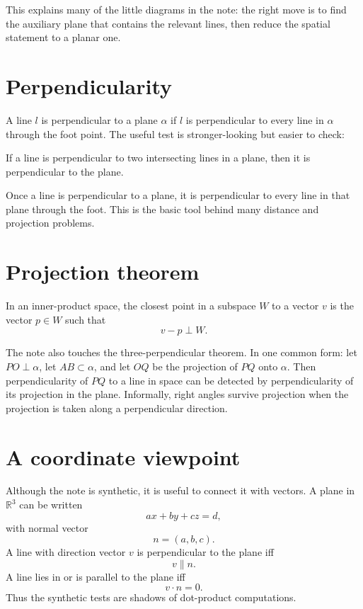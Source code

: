 This explains many of the little diagrams in the note: the right move is to find the auxiliary plane that contains the relevant lines, then reduce the spatial statement to a planar one.

\section{Perpendicularity}

A line \(l\) is perpendicular to a plane \(\alpha\) if \(l\) is perpendicular to every line in \(\alpha\) through the foot point.  The useful test is stronger-looking but easier to check:
\begin{theorem}
If a line is perpendicular to two intersecting lines in a plane, then it is perpendicular to the plane.
\end{theorem}

Once a line is perpendicular to a plane, it is perpendicular to every line in that plane through the foot.  This is the basic tool behind many distance and projection problems.

\section{Projection theorem}

\begin{theorem}
In an inner-product space, the closest point in a subspace \(W\) to a vector \(v\) is the vector \(p\in W\) such that
\[
  v-p\perp W.
\]
\end{theorem}


The note also touches the three-perpendicular theorem.  In one common form: let \(PO\perp\alpha\), let \(AB\subset\alpha\), and let \(OQ\) be the projection of \(PQ\) onto \(\alpha\).  Then perpendicularity of \(PQ\) to a line in space can be detected by perpendicularity of its projection in the plane.  Informally, right angles survive projection when the projection is taken along a perpendicular direction.

\section{A coordinate viewpoint}

Although the note is synthetic, it is useful to connect it with vectors.  A plane in \(\mathbb R^3\) can be written
\[
  ax+by+cz=d,
\]
with normal vector
\[
  n=(a,b,c).
\]
A line with direction vector \(v\) is perpendicular to the plane iff
\[
  v\parallel n.
\]
A line lies in or is parallel to the plane iff
\[
  v\cdot n=0.
\]
Thus the synthetic tests are shadows of dot-product computations.


